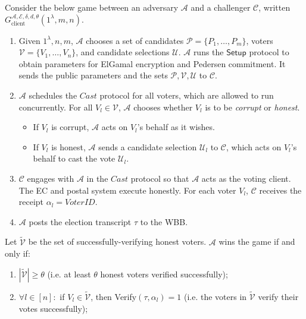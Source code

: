 \documentclass[12pt,a4paper]{article}
\theoremstyle{definition}
\newcommand{\VoterID}{\mathit{VoterID}}
\newcounter{protocol}
\begin{document}
\begin{definition}
    Consider the below game between an adversary $\mathcal{A}$ and a challenger $\mathcal{C}$, written $G_\text{client}^{\mathcal{A},\mathcal{E},\delta,d,\theta}(1^\lambda, m, n)$.
    \begin{enumerate}
        \item Given $1^\lambda, n, m$, $\mathcal{A}$ chooses a set of candidates $\mathcal{P}=\{P_1,\ldots,P_m\}$, voters $\mathcal{V}=\{V_1,\ldots,V_n\}$, and candidate selections $\mathcal{U}$. $\mathcal{A}$ runs the $\mathsf{Setup}$ protocol to obtain parameters for ElGamal encryption and Pedersen commitment. It sends the public parameters and the sets $\mathcal{P}, \mathcal{V}, \mathcal{U}$ to $\mathcal{C}$.
        
        \item $\mathcal{A}$ schedules the $\mathit{Cast}$ protocol for all voters, which are allowed to run concurrently. For all $V_l\in\mathcal{V}$, $\mathcal{A}$ chooses whether $V_l$ is to be \textit{corrupt} or \textit{honest}.
        \begin{itemize}
            \item If $V_l$ is corrupt, $\mathcal{A}$ acts on $V_l$'s behalf as it wishes.
            \item If $V_l$ is honest, $\mathcal{A}$ sends a candidate selection $\mathcal{U}_l$ to $\mathcal{C}$, which acts on $V_l$'s behalf to cast the vote $\mathcal{U}_l$.
        \end{itemize}

        \item $\mathcal{C}$ engages with $\mathcal{A}$ in the $\mathit{Cast}$ protocol so that $\mathcal{A}$ acts as the voting client. The EC and postal system execute honestly. For each voter $V_l$, $\mathcal{C}$ receives the receipt $\alpha_l=\VoterID$.

        \item $\mathcal{A}$ posts the election transcript $\tau$ to the WBB.
    \end{enumerate}
    Let $\tilde{\mathcal{V}}$ be the set of successfully-verifying honest voters. $\mathcal{A}$ wins the game if and only if:
    \begin{enumerate}
        \item $|\tilde{\mathcal{V}}| \geq \theta$ (i.e. at least $\theta$ honest voters verified successfully);
        \item $\forall l \in [n]:$ if $V_l \in \tilde{\mathcal{V}}$, then Verify$(\tau, \alpha_l) 	=1$ (i.e. the voters in $\tilde{\mathcal{V}}$ verify their votes successfully);
    

\end{enumerate}
\end{definition}
\end{document}
